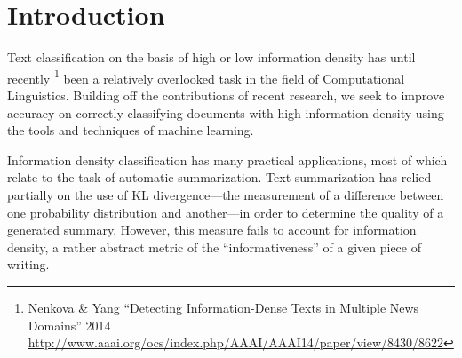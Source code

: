 \documentclass[
10pt, %
a4paper, %
oneside, %
headinclude,footinclude, %
BCOR5mm, %
]{scrartcl}
\title{\normalfont\spacedallcaps{CIS530 Final Report}}
\author{\spacedlowsmallcaps{Stuart Wagner \& Michael Woods}}
\date{}
\begin{document}

\renewcommand{\sectionmark}[1]{\markright{\spacedlowsmallcaps{#1}}}

\lehead{\mbox{\llap{\small\thepage\kern1em\color{halfgray} \vline}\color{halfgray}\hspace{0.5em}\rightmark\hfil}}

\pagestyle{scrheadings}


\maketitle

\setcounter{tocdepth}{2}

\tableofcontents %


\section{Introduction}

Text classification on the basis of high or low information density has until
recently
\footnote{Nenkova \& Yang ``Detecting Information-Dense Texts in Multiple News Domains'' 2014 \newline 
\url{http://www.aaai.org/ocs/index.php/AAAI/AAAI14/paper/view/8430/8622}} 
been a relatively overlooked task in the field of Computational Linguistics. 
Building off the contributions of recent research, we seek to improve accuracy on
correctly classifying documents with high information density using the 
tools and techniques of machine learning.

Information density classification has many practical applications, most of
which relate to the task of automatic summarization. Text summarization has
relied partially on the use of KL divergence---the measurement of a difference
between one probability distribution and another---in order to determine the
quality of a generated summary. However, this measure fails to account for
information density, a rather abstract metric of the ``informativeness'' of a
given piece of writing.
\end{document}
